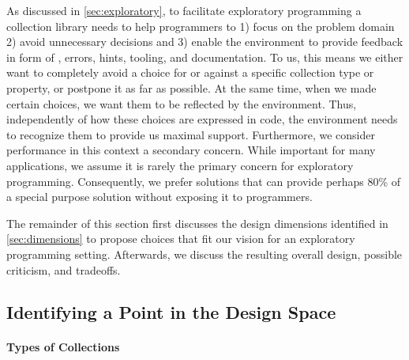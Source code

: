 \documentclass[sigconf, 10pt]{acmart}
\begin{document}

As discussed in \cref{sec:exploratory}, to facilitate exploratory programming
a collection library needs to help programmers to
1) focus on the problem domain
2) avoid unnecessary decisions
and 3) enable the environment to provide feedback in form of
\eg, errors, hints, tooling, and documentation.
To us, this means we either want to completely avoid a choice
for or against a specific collection type or property,
or postpone it as far as possible.
At the same time, when we made certain choices,
we want them to be reflected by the environment.
Thus, independently of how these choices are expressed in code,
the environment needs to recognize them to provide us maximal support.
Furthermore, we consider performance in this context a secondary concern.
While important for many applications,
we assume it is rarely the primary concern for exploratory programming.
Consequently, we prefer solutions that can provide perhaps 80\%
of a special purpose solution without exposing it to programmers. 

The remainder of this section first discusses the design dimensions
identified in \cref{sec:dimensions}
to propose choices that fit our vision for an exploratory programming setting.
Afterwards, we discuss the resulting overall design,
possible criticism, and tradeoffs. 

\subsection{Identifying a Point in the Design Space}

\paragraph{Types of Collections}
\end{document}
